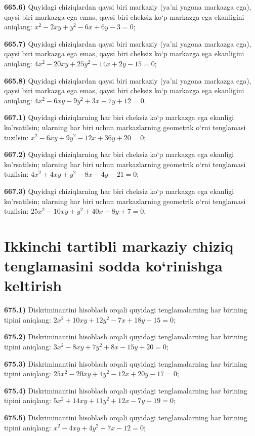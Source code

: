 \textbf{665.6)} Quyidagi chiziqlardan qaysi biri markaziy (ya’ni yagona markazga ega), qaysi biri markazga ega emas, qaysi biri cheksiz ko‘p markazga ega ekanligini aniqlang: $x^2-2 x y+y^2-6 x+6 y-3=0$;

\textbf{665.7)} Quyidagi chiziqlardan qaysi biri markaziy (ya’ni yagona markazga ega), qaysi biri markazga ega emas, qaysi biri cheksiz ko‘p markazga ega ekanligini aniqlang: $4 x^2-20 x y+25 y^2-14 x+2 y-15=0$;

\textbf{665.8)} Quyidagi chiziqlardan qaysi biri markaziy (ya’ni yagona markazga ega), qaysi biri markazga ega emas, qaysi biri cheksiz ko‘p markazga ega ekanligini aniqlang: $4 x^2-6 x y-9 y^2+3 x-7 y+12=0$.

\textbf{667.1)} Quyidagi chiziqlarning har biri cheksiz ko‘p markazga ega ekanligi ko'rsatilsin; ularning har biri uchun markazlarning geometrik o‘rni tenglamasi tuzilsin: $x^2-6 x y+9 y^2-12 x+36 y+20=0$;

\textbf{667.2)} Quyidagi chiziqlarning har biri cheksiz ko‘p markazga ega ekanligi ko'rsatilsin; ularning har biri uchun markazlarning geometrik o‘rni tenglamasi tuzilsin: $4 x^2+4 x y+y^2-8 x-4 y-21=0$;

\textbf{667.3)} Quyidagi chiziqlarning har biri cheksiz ko‘p markazga ega ekanligi ko'rsatilsin; ularning har biri uchun markazlarning geometrik o‘rni tenglamasi tuzilsin: $25 x^2-10 x y+y^2+40 x-8 y+7=0$.



\section{Ikkinchi tartibli markaziy chiziq tenglamasini sodda ko‘rinishga keltirish}



\textbf{675.1)} Diskriminantini hisoblash orqali quyidagi tenglamalarning har birining tipini aniqlang: $2 x^2+10 x y+12 y^2-7 x+18 y-15=0$;

\textbf{675.2)} Diskriminantini hisoblash orqali quyidagi tenglamalarning har birining tipini aniqlang: $3 x^2-8 x y+7 y^2+8 x-15 y+20=0$;

\textbf{675.3)} Diskriminantini hisoblash orqali quyidagi tenglamalarning har birining tipini aniqlang: $25 x^2-20 x y+4 y^2-12 x+20 y-17=0$;

\textbf{675.4)} Diskriminantini hisoblash orqali quyidagi tenglamalarning har birining tipini aniqlang: $5 x^2+14 x y+11 y^2+12 x-7 y+19=0$;

\textbf{675.5)} Diskriminantini hisoblash orqali quyidagi tenglamalarning har birining tipini aniqlang: $x^2-4 x y+4 y^2+7 x-12=0$;

